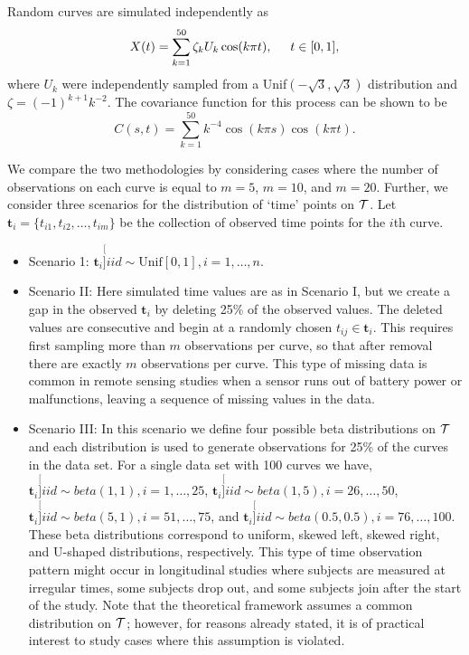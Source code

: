 Random curves are simulated independently as
\begin{equation}
X(t) = \sum^{50}_{k=1}\zeta_k U_k \cos(k\pi t), \hspace{0.5cm} t \in [0,1],
\label{eq:sim process}
\end{equation}
where $U_k$ were independently sampled from a Unif$(-\sqrt{3},\sqrt{3})$ distribution and \(\zeta=(-1)^{k+1}k^{-2}\). 
The covariance function for this process can be shown to be
\begin{equation*}
C(s,t) = \sum^{50}_{k=1}k^{-4} \cos(k\pi s)\cos(k\pi t). 
\end{equation*}

We compare the two methodologies by considering cases where the number of observations on each curve is equal to $m=5$, $m=10$, and $m=20$. Further, we consider three scenarios for the distribution of `time' points on $\mathcal{T}$. Let $\textbf{t}_i = \{t_{i1}, t_{i2}, \dots, t_{im}\}$ be the collection of observed time points for the $i$th curve.
\begin{itemize}
	\item Scenario 1: $\textbf{t}_i \stackrel[]{iid}{\sim} \mbox{Unif}[0,1], i = 1, \dots, n$.
	\item Scenario II: Here simulated time values are as in Scenario I, but we create a gap in the observed $\textbf{t}_i$ by deleting 25\% of the observed values. The deleted values are consecutive and begin at a randomly chosen $t_{ij} \in \textbf{t}_i$. This requires first sampling more than $m$ observations per curve, so that after removal there are exactly $m$ observations per curve. This type of missing data is common in remote sensing studies when a sensor runs out of battery power or malfunctions, leaving a sequence of missing values in the data. 
	\item Scenario III: In this scenario we define four possible beta distributions on $\mathcal{T}$ and each distribution is used to generate observations for 25\% of the curves in the data set. For a single data set with 100 curves we have, $\textbf{t}_i \stackrel[]{iid}{\sim}beta(1,1), i = 1, \dots, 25$,  $\textbf{t}_i \stackrel[]{iid}{\sim}beta(1,5), i = 26, \dots, 50$,  $\textbf{t}_i \stackrel[]{iid}{\sim}beta(5,1), i = 51, \dots, 75$,  and $\textbf{t}_i \stackrel[]{iid}{\sim}beta(0.5,0.5), i = 76, \dots, 100$. These beta distributions correspond to uniform, skewed left, skewed right, and U-shaped distributions, respectively. This type of time observation pattern might occur in longitudinal studies where subjects are measured at irregular times, some subjects drop out, and some subjects join after the start of the study. Note that the theoretical framework assumes a common distribution on $\mathcal{T}$; however, for reasons already stated, it is of practical interest to study cases where this assumption is violated.
	
\end{itemize}  


